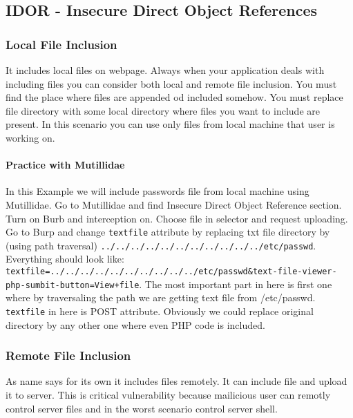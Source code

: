 \subsection{IDOR - Insecure Direct Object References}

\subsubsection{Local File Inclusion} It includes local files on webpage.
Always when your application deals with including files you can consider both local and remote file inclusion.
You must find the place where files are appended od included somehow.
You must replace file directory with some local directory where files you want to include are present.
In this scenario you can use only files from local machine that user is working on.
\paragraph{Practice with Mutillidae}
In this Example we will include passwords file from local machine using Mutillidae.
Go to Mutillidae and find Insecure Direct Object Reference section.
Turn on Burb and interception on.
Choose file in selector and request uploading.
Go to Burp and change \texttt{textfile} attribute by replacing txt file directory by (using path traversal) \texttt{../../../../../../../../../../../etc/passwd}.
Everything should look like: \texttt{textfile=../../../../../../../../../../etc/passwd\&text-file-viewer-php-sumbit-button=View+file}.
The most important part in here is first one where by traversaling the path we are getting text file from /etc/passwd. \texttt{textfile} in here is POST attribute.
Obviously we could replace original directory by any other one where even PHP code is included.

\subsubsection{Remote File Inclusion} As name says for its own it includes files remotely.
It can include file and upload it to server.
This is critical vulnerability because mailicious user can remotly control server files and in the worst scenario control server shell.



